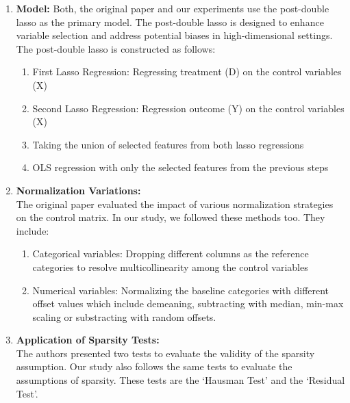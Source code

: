 \begin{enumerate}
    \item \textbf{Model:} Both, the original paper and our experiments use the post-double lasso as the primary model. The post-double lasso is designed to enhance variable selection and address potential biases in high-dimensional settings. The post-double lasso is constructed as follows:
    \begin{enumerate}
        \item First Lasso Regression: Regressing treatment (D) on the control variables (X)
        \item Second Lasso Regression: Regression outcome (Y) on the control variables (X)
        \item Taking the union of selected features from both lasso regressions
        \item OLS regression with only the selected features from the previous steps
    \end{enumerate}
    
    \item \textbf{Normalization Variations:}\\
    The original paper evaluated the impact of various normalization strategies on the control matrix. In our study, we followed these methods too. They include:
    \begin{enumerate}
        \item Categorical variables: Dropping different columns as the reference categories to resolve multicollinearity among the control variables
        \item Numerical variables: Normalizing the baseline categories with different offset values which include demeaning, subtracting with median, min-max scaling or substracting with random offsets. 
    \end{enumerate}

    \item \textbf{Application of Sparsity Tests:}\\
    The authors presented two tests to evaluate the validity of the sparsity assumption. Our study also follows the same tests to evaluate the assumptions of sparsity. These tests are the `Hausman Test' and the `Residual Test'.

    
\end{enumerate}